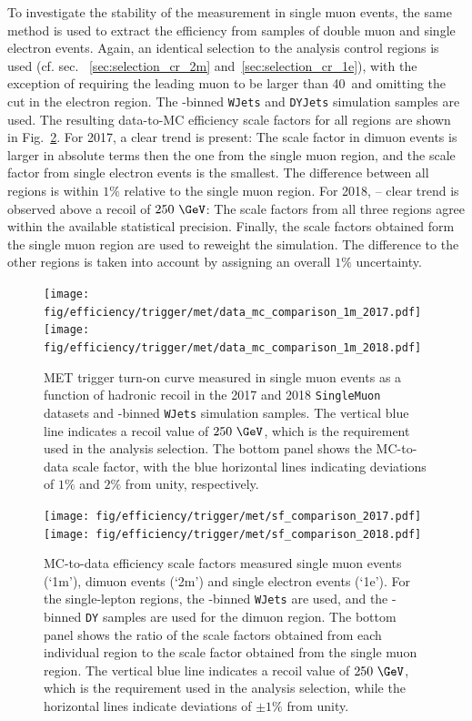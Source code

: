 To investigate the stability of the measurement in single muon events, the same method is used to extract the efficiency from samples of double muon and single electron events. Again, an identical selection to the analysis control regions is used (cf. sec. ~\ref{sec:selection_cr_2m} and~\ref{sec:selection_cr_1e}), with the exception of requiring the leading muon \pt to be larger than 40~\GeV and omitting the \ptmiss cut in the electron region. The \HT-binned \texttt{WJets} and \texttt{DYJets} simulation samples are used. The resulting data-to-MC efficiency scale factors for all regions are shown in Fig.~\ref{fig:hltsf_met}. For 2017, a clear trend is present: The scale factor in dimuon events is larger in absolute terms then the one from the single muon region, and the scale factor from single electron events is the smallest. The difference between all regions is within $1\%$ relative to the single muon region. For 2018, -- clear trend is observed above a recoil of $250~\GeV$: The scale factors from all three regions agree within the available statistical precision. Finally, the scale factors obtained form the single muon region are used to reweight the simulation. The difference to the other regions is taken into account by assigning an overall $1\%$ uncertainty.

\begin{figure}[hbtp]\begin{center}
    \texttt{[image: fig/efficiency/trigger/met/data\_mc\_comparison\_1m\_2017.pdf]}
    \texttt{[image: fig/efficiency/trigger/met/data\_mc\_comparison\_1m\_2018.pdf]}
    \caption{MET trigger turn-on curve measured in single muon events as a function of hadronic recoil \pt in the 2017 and 2018 \texttt{SingleMuon} datasets and \HT-binned \texttt{WJets} simulation samples. The vertical blue line indicates a recoil value of $250~\GeV$, which is the requirement used in the analysis selection. The bottom panel shows the MC-to-data scale factor, with the blue horizontal lines indicating deviations of $1\%$ and $2\%$ from unity, respectively.}
    \label{fig:hlteff_met}
 \end{center}\end{figure}

\begin{figure}[hbtp]\begin{center}
    \texttt{[image: fig/efficiency/trigger/met/sf\_comparison\_2017.pdf]}
    \texttt{[image: fig/efficiency/trigger/met/sf\_comparison\_2018.pdf]}
    \caption{MC-to-data efficiency scale factors measured single muon events (`1m'), dimuon events (`2m') and single electron events (`1e'). For the single-lepton regions, the \HT-binned \texttt{WJets} are used, and the \HT-binned \texttt{DY} samples are used for the dimuon region. The bottom panel shows the ratio of the scale factors obtained from each individual region to the scale factor obtained from the single muon region. The vertical blue line indicates a recoil value of $250~\GeV$, which is the requirement used in the analysis selection, while the horizontal lines indicate deviations of $\pm1\%$ from unity.}
    \label{fig:hltsf_met}
 \end{center}\end{figure}



